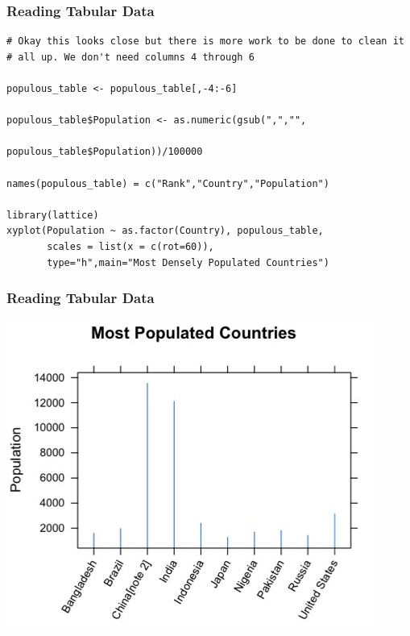 \documentclass{beamer}
\begin{document}
%
\begin{frame}[fragile]
\frametitle{Reading Tabular Data}
\footnotesize
\begin{verbatim}
# Okay this looks close but there is more work to be done to clean it 
# all up. We don't need columns 4 through 6 

populous_table <- populous_table[,-4:-6]

populous_table$Population <- as.numeric(gsub(",","",
                                       populous_table$Population))/100000

names(populous_table) = c("Rank","Country","Population")

library(lattice)
xyplot(Population ~ as.factor(Country), populous_table,
       scales = list(x = c(rot=60)),
       type="h",main="Most Densely Populated Countries")
\end{verbatim}

\end{frame}

%

\begin{frame}[fragile]
\frametitle{Reading Tabular Data}
\begin{center}
\includegraphics{../IMG/world.png}
\end{center}
\end{frame}

\end{document}
